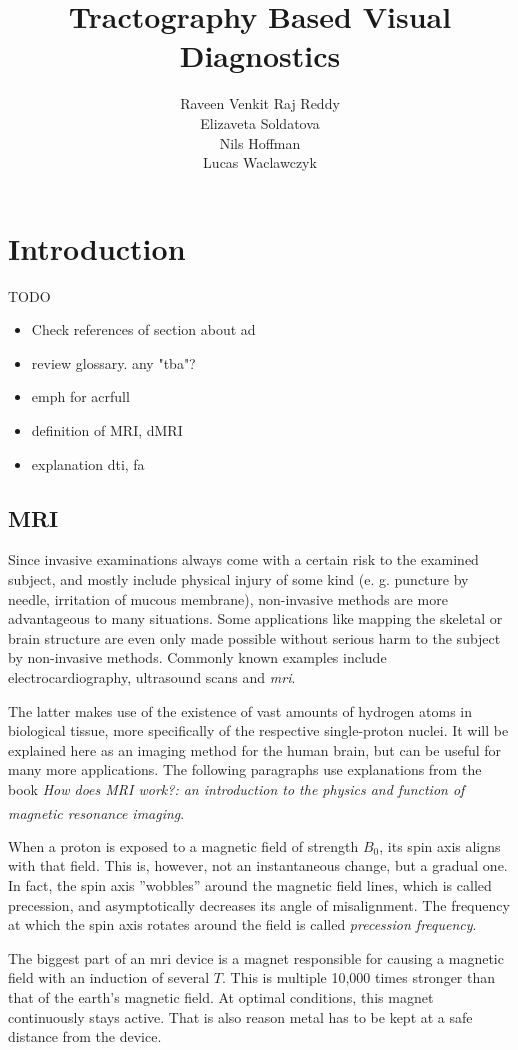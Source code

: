 \documentclass[plainreport]{cgvpub}
\author{Raveen Venkit Raj Reddy\\Elizaveta Soldatova\\Nils Hoffman\\Lucas Waclawczyk}
\title{Tractography Based Visual Diagnostics}
\newcommand{\newcite}[1]{\textsuperscript{\cite{#1}}}
\begin{document}
	\glsaddall
	\chapter{Introduction}
	TODO
	\begin{itemize}
		\item Check references of section about ad
		\item review glossary. any "tba"?
		\item emph for acrfull
		\item definition of MRI, dMRI
		\item explanation dti, fa
	\end{itemize}

	\section{\Gls{MRI}}
	Since invasive examinations always come with a certain risk to the examined subject, and mostly include physical injury of some kind (e. g. puncture by needle, irritation of mucous membrane), non-invasive methods are more advantageous to many situations. Some applications like mapping the skeletal or brain structure are even only made possible without serious harm to the subject by non-invasive methods. Commonly known examples include electrocardiography, ultrasound scans and \emph{\acrfull{mri}}.
	
	The latter makes use of the existence of vast amounts of hydrogen atoms in biological tissue, more specifically of the respective single-proton nuclei. It will be explained here as an imaging method for the human brain, but can be useful for many more applications. The following paragraphs use explanations from the book \emph{How does MRI work?: an introduction to the physics and function of magnetic resonance imaging}\newcite{mri}. 
	
	When a proton is exposed to a magnetic field  of strength $ B_{0} $, its spin axis aligns with that field. This is, however, not an instantaneous change, but a gradual one. In fact, the spin axis ''wobbles'' around the magnetic field lines, which is called precession, and asymptotically decreases its angle of misalignment. The frequency at which the spin axis rotates around the field is called \emph{precession frequency}. 
	
	The biggest part of an \acrshort{mri} device is a magnet responsible for causing a magnetic field with an induction of several $ T $. This is multiple 10,000 times stronger than that of the earth's magnetic field. At optimal conditions, this magnet continuously stays active. That is also reason metal has to be kept at a safe distance from the device.
	
\end{document}
